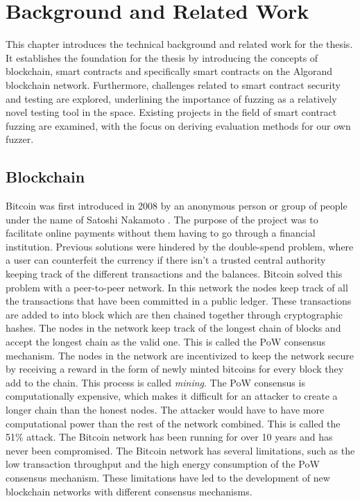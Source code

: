 
\chapter{Background and Related Work}\label{chapter:background}
This chapter introduces the technical background and related work for the thesis. It establishes the foundation for the thesis by introducing the concepts of blockchain, smart contracts and specifically smart contracts on the Algorand blockchain network. Furthermore, challenges related to smart contract security and testing are explored, underlining the importance of fuzzing as a relatively novel testing tool in the space. Existing projects in the field of smart contract fuzzing are examined, with the focus on deriving evaluation methods for our own fuzzer.

\section{Blockchain}
Bitcoin was first introduced in 2008 by an anonymous person or group of people under the name of Satoshi Nakamoto \cite{nakamoto_bitcoin_2008}. The purpose of the project was to facilitate online payments without them having to go through a financial institution. Previous solutions were hindered by the double-spend problem, where a user can counterfeit the currency if there isn't a trusted central authority keeping track of the different transactions and the balances. Bitcoin solved this problem with a peer-to-peer network. In this network the nodes keep track of all the transactions that have been committed in a public ledger. These transactions are added to into block which are then chained together through cryptographic hashes. The nodes in the network keep track of the longest chain of blocks and accept the longest chain as the valid one. This is called the \ac{PoW} consensus mechanism. The nodes in the network are incentivized to keep the network secure by receiving a reward in the form of newly minted bitcoins for every block they add to the chain. This process is called \textit{mining}. The \ac{PoW} consensus is computationally expensive, which makes it difficult for an attacker to create a longer chain than the honest nodes. The attacker would have to have more computational power than the rest of the network combined. This is called the 51\% attack. The Bitcoin network has been running for over 10 years and has never been compromised. The Bitcoin network has several limitations, such as the low transaction throughput and the high energy consumption of the \ac{PoW} consensus mechanism. These limitations have led to the development of new blockchain networks with different consensus mechanisms.

